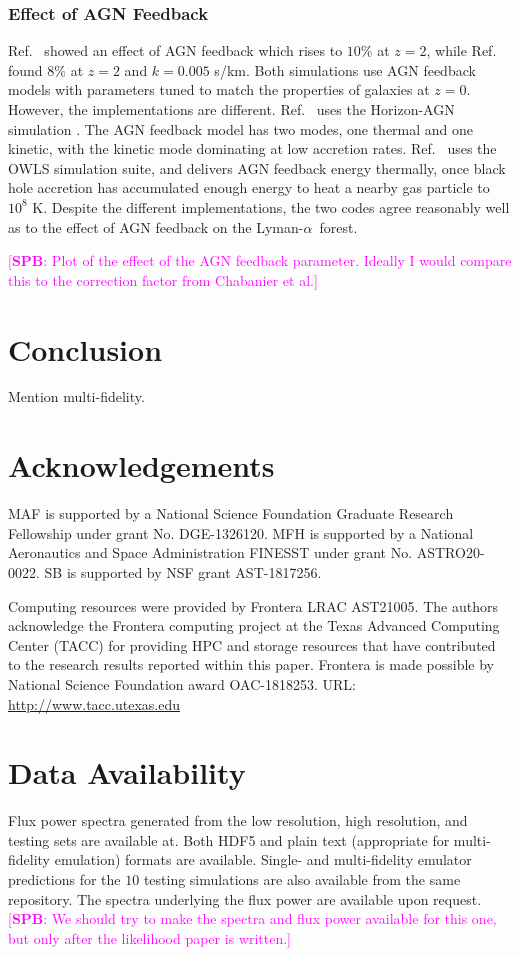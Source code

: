 \documentclass[a4paper,11pt]{article}
\newcommand{\spb}[1]{{\textcolor{magenta}{[{\bf SPB}: #1]}}}
\newcommand{\Lya}{Lyman-$\alpha$}
\begin{document}
\subsubsection{Effect of AGN Feedback}

Ref.~\cite{Viel:2013} showed an effect of AGN feedback which rises to $10\%$ at $z=2$, while Ref.~\cite{Chabanier:2020} found $8\%$ at $z=2$ and $k = 0.005$ s/km. Both simulations use AGN feedback models with parameters tuned to match the properties of galaxies at $z=0$. However, the implementations are different. Ref.~\cite{Chabanier:2020} uses the Horizon-AGN simulation \cite{Dubois:2016}. The AGN feedback model has two modes, one thermal and one kinetic, with the kinetic mode dominating at low accretion rates. Ref.~\cite{Viel:2013} uses the OWLS simulation suite, and delivers AGN feedback energy thermally, once black hole accretion has accumulated enough energy to heat a nearby gas particle to $10^8$ K. Despite the different implementations, the two codes agree reasonably well as to the effect of AGN feedback on the \Lya~forest.

\spb{Plot of the effect of the AGN feedback parameter. Ideally I would compare this to the correction factor from Chabanier et al.}

\section{Conclusion}

Mention multi-fidelity.

\section*{Acknowledgements}
MAF is supported by a National Science Foundation Graduate Research Fellowship under grant No. DGE-1326120.
MFH is supported by a National Aeronautics and Space Administration FINESST under grant No. ASTRO20-0022.
SB is supported by NSF grant AST-1817256.

Computing resources were provided by Frontera LRAC AST21005.
The authors acknowledge the Frontera computing project at the Texas Advanced Computing Center (TACC) for providing HPC and storage resources that have contributed to the research results reported within this paper.
Frontera is made possible by National Science Foundation award OAC-1818253.
URL: \url{http://www.tacc.utexas.edu}

\section*{Data Availability}
Flux power spectra generated from the low resolution, high resolution, and testing sets are available at.
Both HDF5 and plain text (appropriate for multi-fidelity emulation) formats are available.
Single- and multi-fidelity emulator predictions for the $10$ testing simulations are also available from the same repository.
The spectra underlying the flux power are available upon request.
\spb{We should try to make the spectra and flux power available for this one, but only after the likelihood paper is written.}




\appendix

\label{lastpage}
\end{document}
